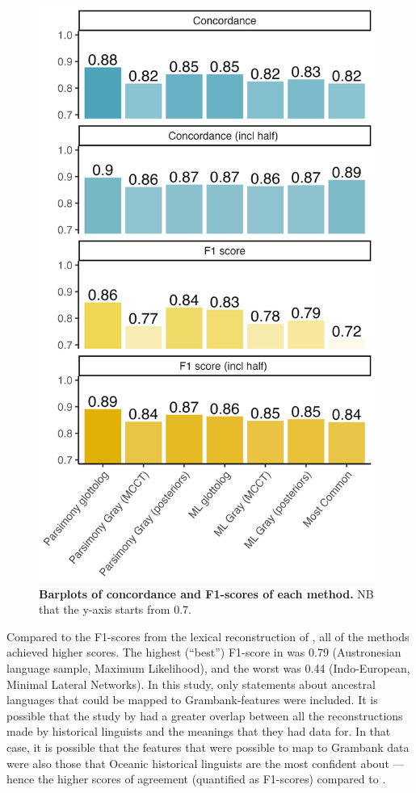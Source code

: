 \documentclass[12pt,letterpaper]{article}
\begin{document}
\begin{figure}[p]
\centering
\includegraphics[width=11cm]{illustrations/plots_from_R/results/barplot_facet_scores.png}
\caption{\textbf{Barplots of concordance and F1-scores of each method.} NB that the y-axis starts from 0.7.}
\label{barplot_facet_results_incl_f1}
\end{figure}

Compared to the F1-scores from the lexical reconstruction of \citet{jager2018using}, all of the methods achieved higher scores. The highest (``best'') F1-score in \citet{jager2018using} was 0.79 (Austronesian language sample, Maximum Likelihood), and the worst was 0.44 (Indo-European, Minimal Lateral Networks). In this study, only statements about ancestral languages that could be mapped to Grambank-features were included. It is  possible that the study by \citet{jager2018using} had a greater overlap between all the reconstructions made by historical linguists and the meanings that they had data for. In that case, it is possible that the features that were possible to map to Grambank data were also those that Oceanic historical linguists are the most confident about --- hence the higher scores of agreement (quantified as F1-scores) compared to \citet{jager2018using}.
\end{document}
